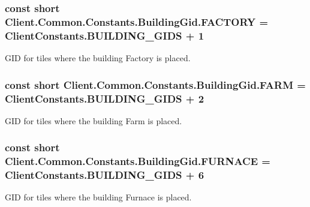 \subsubsection[{F\+A\+C\+T\+O\+R\+Y}]{\setlength{\rightskip}{0pt plus 5cm}const short Client.\+Common.\+Constants.\+Building\+Gid.\+F\+A\+C\+T\+O\+R\+Y = {\bf Client\+Constants.\+B\+U\+I\+L\+D\+I\+N\+G\+\_\+\+G\+I\+D\+S} + 1}\label{classClient_1_1Common_1_1Constants_1_1BuildingGid_a89b0da51d43f94f88fdf5f11ea841910}


G\+I\+D for tiles where the building Factory is placed. 

\hypertarget{classClient_1_1Common_1_1Constants_1_1BuildingGid_ad58b65dd9dbd19ff80536796cb2d553e}{}
\subsubsection[{F\+A\+R\+M}]{\setlength{\rightskip}{0pt plus 5cm}const short Client.\+Common.\+Constants.\+Building\+Gid.\+F\+A\+R\+M = {\bf Client\+Constants.\+B\+U\+I\+L\+D\+I\+N\+G\+\_\+\+G\+I\+D\+S} + 2}\label{classClient_1_1Common_1_1Constants_1_1BuildingGid_ad58b65dd9dbd19ff80536796cb2d553e}


G\+I\+D for tiles where the building Farm is placed. 

\hypertarget{classClient_1_1Common_1_1Constants_1_1BuildingGid_a448960bac471f9527ac2d2c76e5ab8e0}{}
\subsubsection[{F\+U\+R\+N\+A\+C\+E}]{\setlength{\rightskip}{0pt plus 5cm}const short Client.\+Common.\+Constants.\+Building\+Gid.\+F\+U\+R\+N\+A\+C\+E = {\bf Client\+Constants.\+B\+U\+I\+L\+D\+I\+N\+G\+\_\+\+G\+I\+D\+S} + 6}\label{classClient_1_1Common_1_1Constants_1_1BuildingGid_a448960bac471f9527ac2d2c76e5ab8e0}


G\+I\+D for tiles where the building Furnace is placed. 

